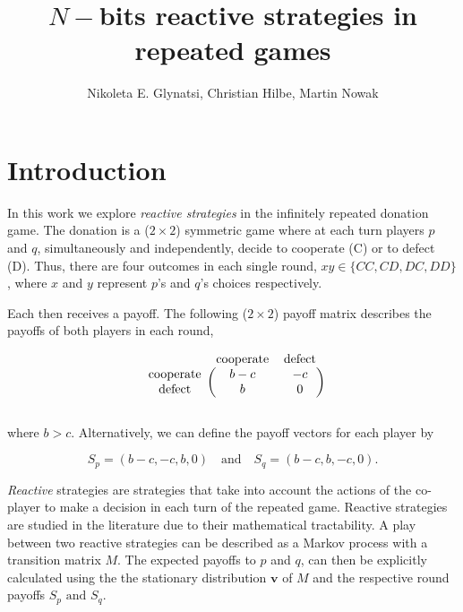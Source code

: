 \documentclass{article}
\title{$N-$bits reactive strategies in repeated games}
\author{Nikoleta E. Glynatsi, Christian Hilbe, Martin Nowak}
\date{}
\begin{document}
\maketitle

\section{Introduction}

In this work we explore \textit{reactive strategies} in the infinitely repeated
donation game. The donation is a (\(2 \times 2\)) symmetric game where at each
turn players \(p\) and \(q\), simultaneously and independently, decide to
cooperate (C) or to defect (D). Thus, there are four outcomes in each single
round, \(xy \in \{CC, CD, DC, DD\}\), where \(x\) and \(y\) represent \(p\)'s
and \(q\)'s choices respectively.

Each then receives a payoff. The following (\(2 \times 2\)) payoff matrix describes
the payoffs of both players in each round,

\begin{equation}\label{eq:payoffs}
    \begin{blockarray}{ccc}
        & \text{cooperate} & \text{defect} \\
        \begin{block}{c(cc)}
            \text{cooperate} & b - c & -c \\
            \text{defect} & b & 0 \\
        \end{block}
    \end{blockarray}
  \end{equation}

where \(b > c\). Alternatively, we can define the payoff vectors for each player by

\begin{equation}\label{eq:vector_payoffs}
  S_{p} = (b-c, -c, b, 0) \quad \textrm{and} \quad  S_{q} = (b-c, b, -c, 0).
\end{equation}

\textit{Reactive} strategies are strategies that take into account the actions
of the co-player to make a decision in each turn of the repeated game. Reactive
strategies are studied in the literature due to their mathematical tractability.
A play between two reactive strategies can be described as a Markov process with
a transition matrix \(M\). The expected payoffs to \(p\) and \(q\), can then be
explicitly calculated using the the stationary distribution \(\mathbf{v}\) of
\(M\) and the respective round payoffs \(S_{p} \textrm{ and } S_{q}\).
\end{document}
